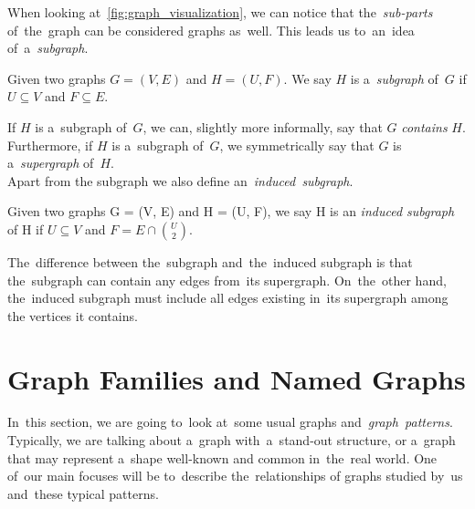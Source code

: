 When looking at~\autoref{fig:graph_visualization}, we can notice that the~\textit{sub-parts} of~the~graph can be considered graphs as~well. This leads us to~an~idea of~a~\textit{subgraph}.

\begin{definition}[Subgraph]
    Given two graphs $G = (V, E)$ and $H = (U, F)$. We say $H$ is a~\emph{subgraph} of~$G$ if $U \subseteq V$ and $F \subseteq E$.
\end{definition}
If $H$ is a~subgraph of~$G$, we can, slightly more informally, say that $G$ \textit{contains} $H$. Furthermore, if $H$ is a~subgraph of~$G$, we symmetrically say that $G$ is a~\textit{supergraph} of~$H$. \\
Apart from the subgraph we also define an~\emph{induced~subgraph}.
\begin{definition}
    Given two graphs G = (V, E) and H = (U, F), we say H is an \emph{induced subgraph} of H if $U \subseteq V$ and $F = E \cap {U\choose2}$.
\end{definition}
The~difference between the~subgraph and~the~induced subgraph is that the~subgraph can contain any edges from~its supergraph. On~the~other hand, the~induced subgraph must include all edges existing in~its supergraph among the vertices it contains.

\section{Graph Families and Named Graphs}
In~this section, we are going to~look at~some usual graphs and~\textit{graph~patterns}. Typically, we are talking about a~graph with~a~stand-out structure, or a~graph that may represent a~shape well-known and common in~the~real world. One of~our main focuses will be to~describe the~relationships of graphs studied by~us and~these typical patterns.
\\
\\
\\

